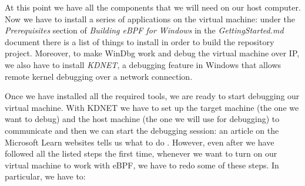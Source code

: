 At this point we have all the components that we will need on our host computer.
Now we have to install a series of applications on the virtual machine: under the \textit{Prerequisites} section of \textit{Building eBPF for Windows} in the \textit{GettingStarted.md} document \cite{GetStartDoc} there is a list of things to install in order to build the repository project.
Moreover, to make WinDbg work and debug the virtual machine over IP, we also have to install \textit{KDNET}, a debugging feature in Windows that allows remote kernel debugging over a network connection.

Once we have installed all the required tools, we are ready to start debugging our virtual machine.
With KDNET we have to set up the target machine (the one we want to debug) and the host machine (the one we will use for debugging) to communicate and then we can start the debugging session: an article on the Microsoft Learn websites tells us what to do \cite{SetUpNetDebug}.
However, even after we have followed all the listed steps the first time, whenever we want to turn on our virtual machine to work with eBPF, we have to redo some of these steps.
In particular, we have to:

